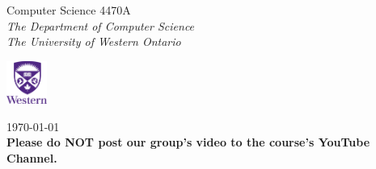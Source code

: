 \documentclass[11pt]{article}
\begin{document}
\begin{titlepage}
\begin{center}
            \vfill


            Computer Science 4470A\\
            \textsl{The Department of Computer Science\\
            The University of Western Ontario}

            \vspace{5pt}
            \includegraphics[width=0.1\textwidth]{Stacked_CMYK}   %
            \vspace{5pt}

            \today\\
            \textbf{Please do NOT post our group's video to the course's YouTube Channel.}

        \end{center}
    \end{titlepage}
\end{document}

